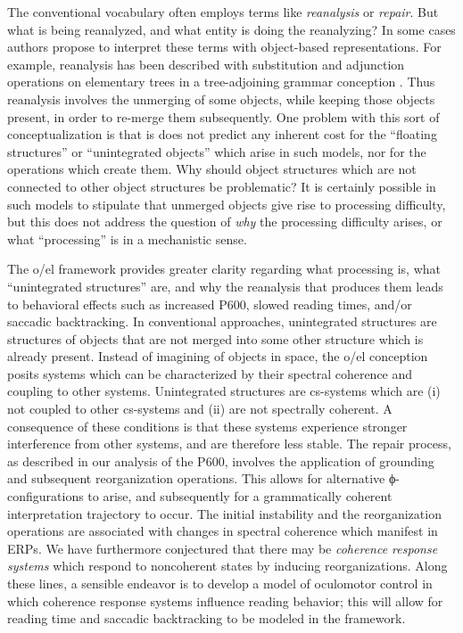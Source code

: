 The conventional vocabulary often employs terms like \textit{reanalysis} or \textit{repair}. But what is being reanalyzed, and what entity is doing the reanalyzing? In some cases authors propose to interpret these terms with object-based representations. For example, reanalysis has been described with substitution and adjunction operations on elementary trees in a tree-adjoining grammar conception \citep{FFerreiraEtAl2004}. Thus reanalysis involves the unmerging of some objects, while keeping those objects present, in order to re-merge them subsequently. One problem with this sort of conceptualization is that is does not predict any inherent cost for the “floating structures” or “unintegrated objects” which arise in such models, nor for the operations which create them. Why should object structures which are not connected to other object structures be problematic? It is certainly possible in such models to stipulate that unmerged objects give rise to processing difficulty, but this does not address the question of \textit{why} the processing difficulty arises, or what “processing” is in a mechanistic sense.

The o/el framework provides greater clarity regarding what processing is, what “unintegrated structures” are, and why the reanalysis that produces them leads to behavioral effects such as increased P600, slowed reading times, and/or saccadic backtracking. In conventional approaches, unintegrated structures are structures of objects that are not merged into some other structure which is already present. Instead of imagining of objects in space, the o/el conception posits systems which can be characterized by their spectral coherence and coupling to other systems. Unintegrated structures are cs-systems which are (i) not coupled to other cs-systems and (ii) are not spectrally coherent. A consequence of these conditions is that these systems experience stronger interference from other systems, and are therefore less stable. The repair process, as described in our analysis of the P600, involves the application of grounding and subsequent reorganization operations. This allows for alternative ϕ-configurations to arise, and subsequently for a grammatically coherent interpretation trajectory to occur. The initial instability and the reorganization operations are associated with changes in spectral coherence which manifest in ERPs. We have furthermore conjectured that there may be \textit{coherence response systems} which respond to noncoherent states by inducing reorganizations. Along these lines, a sensible endeavor is to develop a model of oculomotor control in which coherence response systems influence reading behavior; this will allow for reading time and saccadic backtracking to be modeled in the framework.

